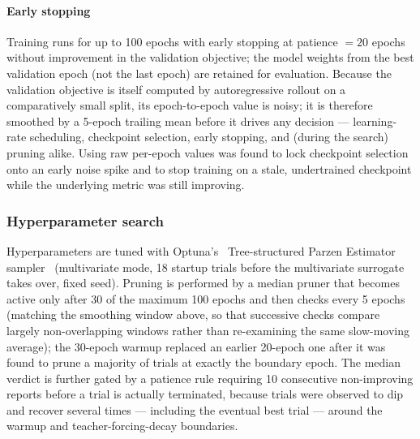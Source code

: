 \paragraph{Early stopping}
Training runs for up to 100 epochs with early stopping at patience $=20$ epochs without improvement in the validation objective; the model weights from the best validation epoch (not the last epoch) are retained for
evaluation. Because the validation objective is itself computed by autoregressive rollout on a comparatively small split, its epoch-to-epoch value is noisy; it is therefore smoothed by a 5-epoch trailing mean before it drives any decision — learning-rate scheduling, checkpoint selection, early stopping, and (during the search) pruning alike. Using raw per-epoch values was found to lock checkpoint selection onto an early noise spike and to stop training on a stale, undertrained checkpoint while the underlying metric was still improving.

\subsubsection{Hyperparameter search}
\label{sec:hpo}

Hyperparameters are tuned with Optuna's~\cite{akiba2019optuna} Tree-structured Parzen Estimator sampler~\cite{bergstra2011tpe} (multivariate mode, 18 startup trials before the multivariate surrogate takes over, fixed seed). Pruning is performed by a median pruner that becomes active only after 30 of the maximum 100 epochs and then checks every 5 epochs (matching the smoothing window above, so that successive checks compare largely non-overlapping windows rather than re-examining the same slow-moving average); the 30-epoch warmup replaced an earlier 20-epoch one after it was found to prune a majority of trials at exactly the boundary epoch. The median verdict is further gated by a patience rule requiring 10 consecutive non-improving reports before a trial is actually terminated, because trials were observed to dip and recover several times — including the eventual best trial — around the warmup and teacher-forcing-decay boundaries.

